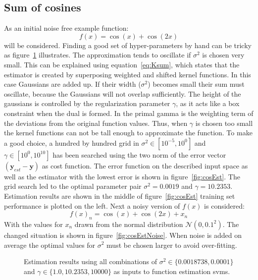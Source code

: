 \subsection{Sum of cosines}
As an initial noise free example function:
\begin{equation}
f(x) = \cos(x) + \cos(2x)
\end{equation}
will be considered. Finding a good set of hyper-parameters by hand can be tricky as figure~\ref{fig:estParamsTricky} illustrates. The approximation tends to oscillate if $\sigma^2$ is chosen very small. This can be explained using equation~\ref{eq:Ksum}, which states that the estimator is created by superposing weighted and shifted kernel functions. In this case Gaussians are added up. If their width ($\sigma^2$) becomes small their sum must oscillate, because the Gaussians will not overlap sufficiently. The height of the gaussians is controlled by the regularization parameter $\gamma$, as it acts like a box constraint when the dual is formed. In the primal gamma is the weighting term of the deviations from the original function values. Thus, when $\gamma$ is chosen too small the kernel functions can not be tall enough to approximate the function.  
To make a good choice, a hundred by hundred grid in $\sigma^2 \in [10^{-5},10^{0}]$ and $\gamma \in [10^{0},10^{10}]$  has been searched using the two norm of the error vector $(\mathbf{y}_{est} - \mathbf{y})$ as cost function. The error function on the described input space as well as the estimator with the lowest error is shown in figure~\ref{fig:cosEst}. The grid search led to the  optimal parameter pair $\sigma^2 = 0.0019$ and $\gamma = 10.2353$. Estimation results are shown in the middle of figure~\ref{fig:cosEst} training set performance is plotted on the left.
Next a noisy version of $f(x)$ is considered:
\begin{equation}
f(x)_n = \cos(x) + \cos(2x) + x_n
\end{equation}
With the values for $x_n$ drawn from the normal distribution $\mathcal{N}(0,0.1^2)$. The changed situation is shown in figure~\ref{fig:cosEstNoise}. When noise is added on average the optimal values for $\sigma^2$ must be chosen larger to avoid 
over-fitting.
\begin{figure}
\centering

\caption{Estimation results using all combinations of $\sigma^2 \in \{0.0018738, 0.0001\}$ and $\gamma \in \{1.0, 10.2353 ,10000 \}$ as inputs to function estimation svms.}
\label{fig:estParamsTricky}
\end{figure}
